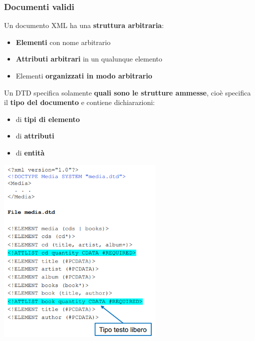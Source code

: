 \documentclass[12pt]{article}
\begin{document}
\subsubsection{Documenti validi}
Un documento XML ha una \textbf{struttura arbitraria}:
\begin{itemize}
    \item \textbf{Elementi} con nome arbitrario
    \item \textbf{Attributi arbitrari} in un qualunque elemento
    \item Elementi \textbf{organizzati in modo arbitrario}
\end{itemize}
Un DTD specifica solamente \textbf{quali sono le strutture ammesse}, cioè specifica il \textbf{tipo del documento} e contiene dichiarazioni:
\begin{itemize}
    \item di \textbf{tipi di elemento}
    \item di \textbf{attributi}
    \item di \textbf{entità}
\end{itemize}
\begin{center}
    \includegraphics[width = 0.60\textwidth]{Images/148.PNG}
\end{center}
\end{document}
